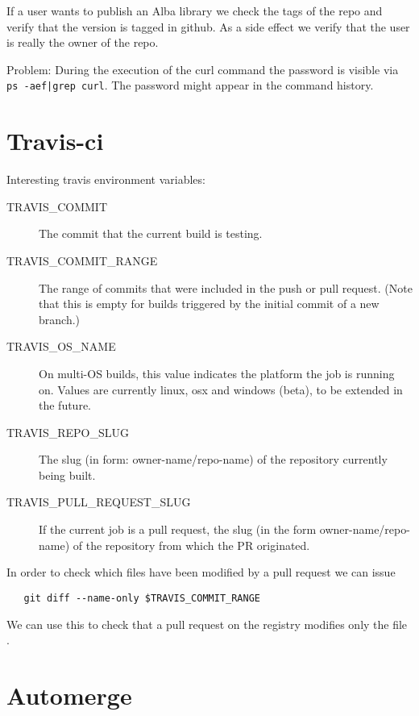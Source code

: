 If a user wants to publish an Alba library we check the tags of the repo and
verify that the version is tagged in github. As a side effect we verify that
the user is really the owner of the repo.


Problem: During the execution of the curl command the password is visible via
{\tt ps -aef|grep curl}. The password might appear in the command history.



\section{Travis-ci}

Interesting travis environment variables:
\begin{description}

\item[TRAVIS\_COMMIT] The commit that the current build is testing.

\item[TRAVIS\_COMMIT\_RANGE] The range of commits that were included in the push
  or pull request. (Note that this is empty for builds triggered by the
  initial commit of a new branch.)
  
\item[TRAVIS\_OS\_NAME] On multi-OS builds, this value indicates the platform
  the job is running on. Values are currently linux, osx and windows (beta),
  to be extended in the future.

\item[TRAVIS\_REPO\_SLUG] The slug (in form: owner-name/repo-name) of the
  repository currently being built.


\item[TRAVIS\_PULL\_REQUEST\_SLUG] If the current job is a pull request, the slug
  (in the form owner-name/repo-name) of the repository from which the PR
  originated.

\end{description}
%
In order to check which files have been modified by a pull request we can
issue
{\small
\begin{verbatim}
   git diff --name-only $TRAVIS_COMMIT_RANGE
\end{verbatim}
}

We can use this to check that a pull request on the registry modifies only the
file .



\section{Automerge}

